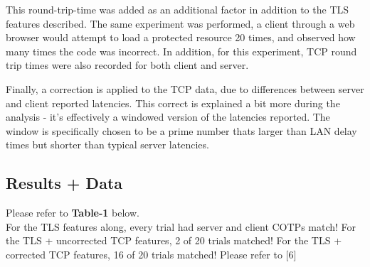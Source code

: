 \documentclass[a4paper, 11pt]{article} 				%
\begin{document}
This round-trip-time was added as an additional factor in addition to the TLS features described. The same experiment was performed, a client through a web browser would attempt to load a protected resource 20 times, and observed how many times the code was incorrect. In addition, for this experiment, TCP round trip times were also recorded for both client and server.

Finally, a correction is applied to the TCP data, due to differences between server and client reported latencies. This correct is explained a bit more during the analysis - it's effectively a windowed version of the latencies reported. The window is specifically chosen to be a prime number thats larger than LAN delay times but shorter than typical server latencies.

\subsection{Results + Data}
\noindent 
Please refer to \textbf{Table-1} below.\\
For the TLS features along, every trial had server and client COTPs match! 
For the TLS + uncorrected TCP features, 2 of 20 trials matched!
For the TLS + corrected TCP features, 16 of 20 trials matched!
Please refer to [6]
\end{document}
